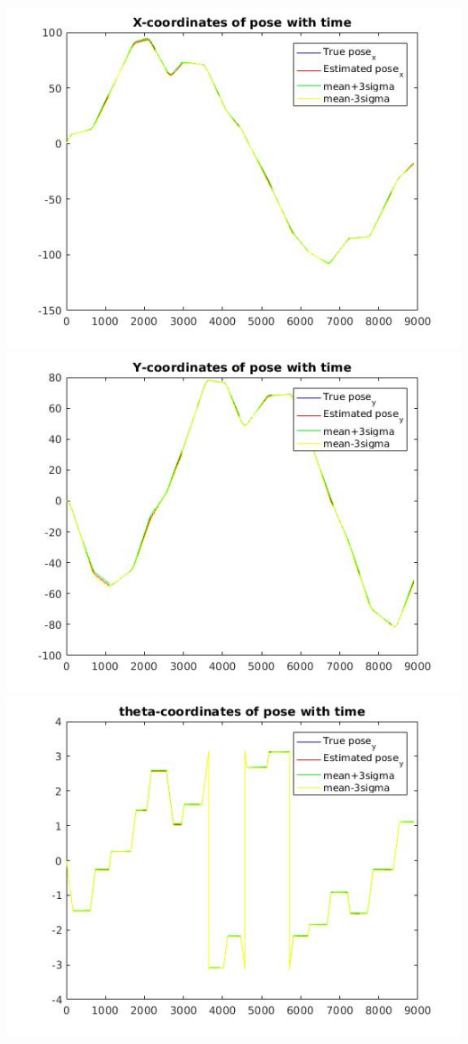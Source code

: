 \documentclass[a4paper,fleqn,11pt]{article}
\theoremstyle{mytheor}
\begin{document}
\begin{center}
\includegraphics[scale = 0.37]{../images/EKF-perfect-control-xvt.jpg}
\includegraphics[scale = 0.37]{../images/EKF-perfect-control-yvt.jpg}
\includegraphics[scale = 0.37]{../images/EKF-perfect-control-avt.jpg}

\end{center}
\end{document}
